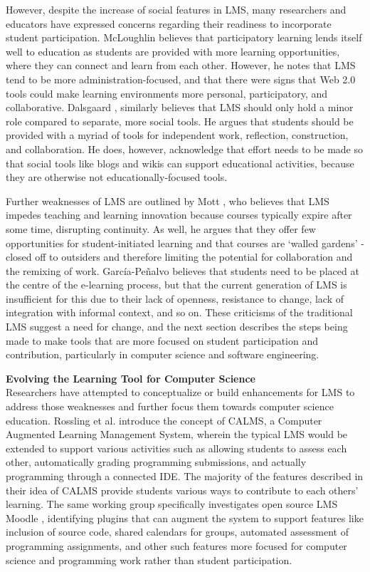 \begin{itemize}
However, despite the increase of social features in LMS, many researchers and educators have expressed concerns regarding their readiness to incorporate student participation. McLoughlin \cite{mcloughlin2007social} believes that participatory learning lends itself well to education as students are provided with more learning opportunities, where they can connect and learn from each other. However, he notes that LMS tend to be more administration-focused, and that there were signs that Web 2.0 tools could make learning environments more personal, participatory, and collaborative. Dalsgaard \cite{dalsgaard2006social}, similarly believes that LMS should only hold a minor role compared to separate, more social tools. He argues that students should be provided with a myriad of tools for independent work, reflection, construction, and collaboration. He does, however, acknowledge that effort needs to be made so that social tools like blogs and wikis can support educational activities, because they are otherwise not educationally-focused tools.

Further weaknesses of LMS are outlined by Mott \cite{mott2010envisioning}, who believes that LMS impedes teaching and learning innovation because courses typically expire after some time, disrupting continuity. As well, he argues that they offer few opportunities for student-initiated learning and that courses are `walled gardens' - closed off to outsiders and therefore limiting the potential for collaboration and the remixing of work. García-Peñalvo \cite{garcia2011opening} believes that students need to be placed at the centre of the e-learning process, but that the current generation of LMS is insufficient for this due to their lack of openness, resistance to change, lack of integration with informal context, and so on. These criticisms of the traditional LMS suggest a need for change, and the next section describes the steps being made to make tools that are more focused on student participation and contribution, particularly in computer science and software engineering.

\textbf{Evolving the Learning Tool for Computer Science} \\

Researchers have attempted to conceptualize or build enhancements for LMS to address those weaknesses and further focus them towards computer science education. Rossling et al. \cite{rossling2008enhancing} introduce the concept of CALMS, a Computer Augmented Learning Management System, wherein the typical LMS would be extended to support various activities such as allowing students to assess each other, automatically grading programming submissions, and actually programming through a connected IDE. The majority of the features described in their idea of CALMS provide students various ways to contribute to each others' learning. The same working group specifically investigates open source LMS Moodle \cite{rossling2010adapting}, identifying plugins that can augment the system to support features like inclusion of source code, shared calendars for groups, automated assessment of programming assignments, and other such features more focused for computer science and programming work rather than student participation.


\end{itemize}
